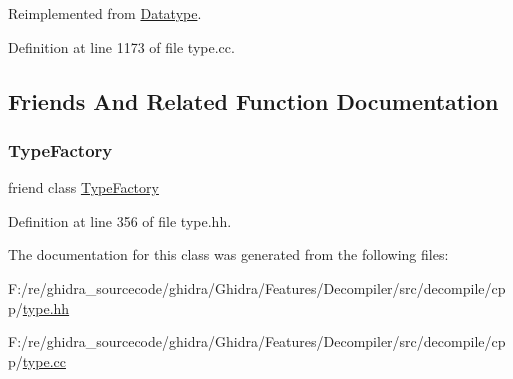 Reimplemented from \mbox{\hyperlink{class_datatype_a33339824f1c50d4354952296070c3902}{Datatype}}.



Definition at line 1173 of file type.\+cc.



\subsection{Friends And Related Function Documentation}
\mbox{\label{class_type_spacebase_ac8c1945d0a63785e78b3e09a13226ed6}} 
\subsubsection{\texorpdfstring{TypeFactory}{TypeFactory}}
{\footnotesize\ttfamily friend class \mbox{\hyperlink{class_type_factory}{Type\+Factory}}\hspace{0.3cm}{\ttfamily [friend]}}



Definition at line 356 of file type.\+hh.



The documentation for this class was generated from the following files\+:\begin{DoxyCompactItemize}
\item 
F\+:/re/ghidra\+\_\+sourcecode/ghidra/\+Ghidra/\+Features/\+Decompiler/src/decompile/cpp/\mbox{\hyperlink{type_8hh}{type.\+hh}}\item 
F\+:/re/ghidra\+\_\+sourcecode/ghidra/\+Ghidra/\+Features/\+Decompiler/src/decompile/cpp/\mbox{\hyperlink{type_8cc}{type.\+cc}}\end{DoxyCompactItemize}
